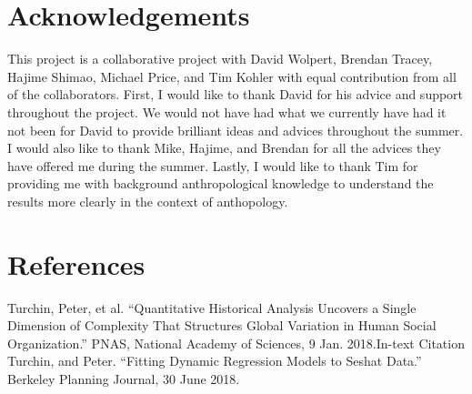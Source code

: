 \documentclass[11pt]{article}
\begin{document}
\section{Acknowledgements}

This project is a collaborative project with David Wolpert, Brendan Tracey, Hajime Shimao, Michael Price, and Tim Kohler with equal contribution from all of the collaborators. First, I would like to thank David for his advice and support throughout the project. We would not have had what we currently have had it not been for David to provide brilliant ideas and advices throughout the summer. I would also like to thank Mike, Hajime, and Brendan for all the advices they have offered me during the summer. Lastly, I would like to thank Tim for providing me with background anthropological knowledge to understand the results more clearly in the context of anthopology. 

\section{References}
Turchin, Peter, et al. “Quantitative Historical Analysis Uncovers a Single Dimension of Complexity That Structures Global Variation in Human Social Organization.” PNAS, National Academy of Sciences, 9 Jan. 2018.In-text Citation\\

Turchin, and Peter. “Fitting Dynamic Regression Models to Seshat Data.” Berkeley Planning Journal, 30 June 2018.
\end{document}
